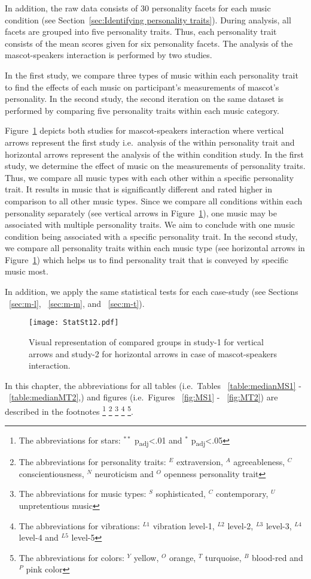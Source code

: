 In addition, the raw data consists of 30 personality facets for each music condition
(see Section~\ref{sec:Identifying personality traits}).
During analysis, all facets are grouped into five personality traits.
Thus, each personality trait consists of the mean scores given for six personality facets.
The analysis of the mascot-speakers interaction is performed by two studies.

In the first study, we compare three types of music within each personality trait
to find the effects of each music on participant's measurements of mascot's personality.
In the second study, the second iteration on the same dataset is performed by comparing five personality traits
within each music category.

Figure~\ref{fig:Stat12} depicts both studies for mascot-speakers interaction where vertical arrows represent the first study
i.e.\ analysis of the within personality trait and horizontal arrows represent the analysis of the within condition study.
In the first study, we determine the effect of music on the measurements of personality traits.
Thus, we compare all music types with each other within a specific personality trait.
It results in music that is significantly different and rated higher in comparison to all other music types.
Since we compare all conditions within each personality separately (see vertical arrows in Figure~\ref{fig:Stat12}),
one music may be associated with multiple personality traits.
We aim to conclude with one music condition being associated with a specific personality trait.
In the second study, we compare all personality traits within each music type (see horizontal
arrows in Figure~\ref{fig:Stat12}) which helps us to find personality trait that is conveyed by specific music most.

In addition, we apply the same statistical tests for each case-study
(see Sections ~\ref{sec:m-l}, ~\ref{sec:m-m}, and ~\ref{sec:m-t}).

\begin{figure}[hbt!]
    \centering
    \texttt{[image: StatSt12.pdf]}
    \caption{Visual representation of compared groups in study-1 for vertical arrows and
    study-2 for horizontal arrows in case of mascot-speakers interaction.}
    \label{fig:Stat12}
\end{figure}

In this chapter, the abbreviations for all tables
(i.e.\ Tables ~\ref{table:medianMS1} - ~\ref{table:medianMT2},) and figures
(i.e.\ Figures ~\ref{fig:MS1} - ~\ref{fig:MT2}) are described in the footnotes
\footnote[1]{The abbreviations for stars: $^{**}$ p\textsubscript{adj}<.01 and $^{*}$ p\textsubscript{adj}<.05}
\footnote[2]{The abbreviations for personality traits: $^{E}$ extraversion, $^{A}$ agreeableness, $^{C}$ conscientiousness, $^{N}$ neuroticism
and $^{O}$ openness personality trait}
\footnote[3]{The abbreviations for music types: $^{S}$ sophisticated, $^{C}$ contemporary, $^{U}$ unpretentious music}
\footnote[4]{The abbreviations for vibrations: $^{L1}$ vibration level-1, $^{L2}$ level-2, $^{L3}$ level-3, $^{L4}$ level-4 and $^{L5}$ level-5}
\footnote[5]{The abbreviations for colors: $^{Y}$ yellow, $^{O}$ orange, $^{T}$ turquoise, $^{B}$ blood-red and $^{P}$ pink color}.
